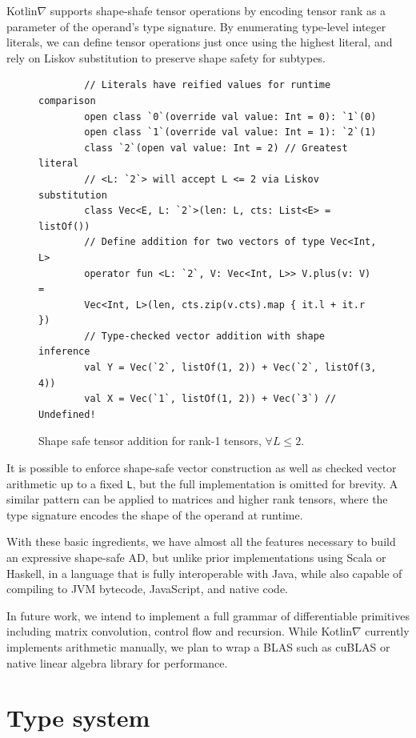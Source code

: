 \documentclass[12pt,initial,twoside,maitrise]{dms}
\numberwithin{equation}{section}
\numberwithin{table}{chapter}
\numberwithin{figure}{chapter}
\begin{document}
Kotlin$\nabla$ supports shape-shafe tensor operations by encoding tensor rank as a parameter of the operand's type signature. By enumerating type-level integer literals, we can define tensor operations just once using the highest literal, and rely on Liskov substitution to preserve shape safety for subtypes.

\begin{figure}[!htb]
    \begin{verbatim}
        // Literals have reified values for runtime comparison
        open class `0`(override val value: Int = 0): `1`(0)
        open class `1`(override val value: Int = 1): `2`(1)
        class `2`(open val value: Int = 2) // Greatest literal
        // <L: `2`> will accept L <= 2 via Liskov substitution
        class Vec<E, L: `2`>(len: L, cts: List<E> = listOf())
        // Define addition for two vectors of type Vec<Int, L>
        operator fun <L: `2`, V: Vec<Int, L>> V.plus(v: V) =
        Vec<Int, L>(len, cts.zip(v.cts).map { it.l + it.r })
        // Type-checked vector addition with shape inference
        val Y = Vec(`2`, listOf(1, 2)) + Vec(`2`, listOf(3, 4))
        val X = Vec(`1`, listOf(1, 2)) + Vec(`3`) // Undefined!
    \end{verbatim}
    \caption{Shape safe tensor addition for rank-1 tensors, $\forall L\leq2.$}
\end{figure}

It is possible to enforce shape-safe vector construction as well as checked vector arithmetic up to a fixed \texttt{L}, but the full implementation is omitted for brevity. A similar pattern can be applied to matrices and higher rank tensors, where the type signature encodes the shape of the operand at runtime.

With these basic ingredients, we have almost all the features necessary to build an expressive shape-safe AD, but unlike prior implementations using Scala or Haskell, in a language that is fully interoperable with Java, while also capable of compiling to JVM bytecode, JavaScript, and native code.

In future work, we intend to implement a full grammar of differentiable primitives including matrix convolution, control flow and recursion. While Kotlin$\nabla$ currently implements arithmetic manually, we plan to wrap a BLAS such as cuBLAS or native linear algebra library for performance.

\section{Type system}
\end{document}
